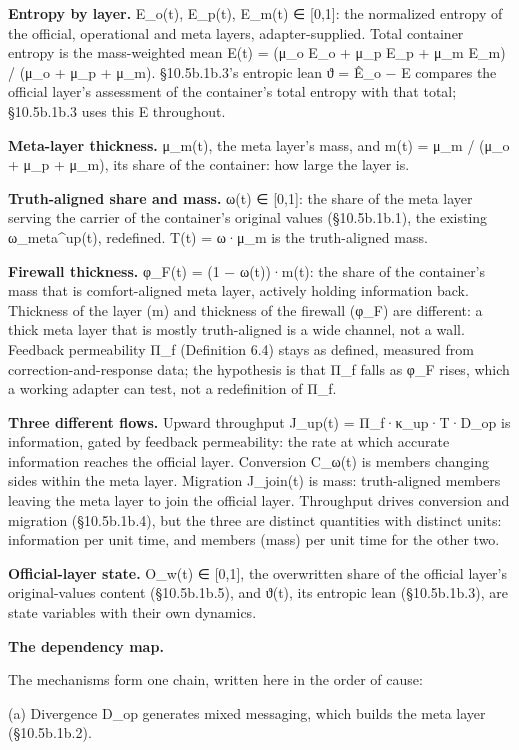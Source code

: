 \documentclass[
]{article}
\begin{document}
\textbf{Entropy by layer.} E\_o(t), E\_p(t), E\_m(t) ∈ {[}0,1{]}: the
normalized entropy of the official, operational and meta layers,
adapter-supplied. Total container entropy is the mass-weighted mean E(t)
= (μ\_o E\_o + μ\_p E\_p + μ\_m E\_m) / (μ\_o + μ\_p + μ\_m).
§10.5b.1b.3's entropic lean ϑ = Ê\_o − E compares the official layer's
assessment of the container's total entropy with that total; §10.5b.1b.3
uses this E throughout.

\textbf{Meta-layer thickness.} μ\_m(t), the meta layer's mass, and m(t)
= μ\_m / (μ\_o + μ\_p + μ\_m), its share of the container: how large the
layer is.

\textbf{Truth-aligned share and mass.} ω(t) ∈ {[}0,1{]}: the share of
the meta layer serving the carrier of the container's original values
(§10.5b.1b.1), the existing ω\_meta\^{}up(t), redefined. T(t) = ω·μ\_m
is the truth-aligned mass.

\textbf{Firewall thickness.} φ\_F(t) = (1 − ω(t))·m(t): the share of the
container's mass that is comfort-aligned meta layer, actively holding
information back. Thickness of the layer (m) and thickness of the
firewall (φ\_F) are different: a thick meta layer that is mostly
truth-aligned is a wide channel, not a wall. Feedback permeability Π\_f
(Definition 6.4) stays as defined, measured from correction-and-response
data; the hypothesis is that Π\_f falls as φ\_F rises, which a working
adapter can test, not a redefinition of Π\_f.

\textbf{Three different flows.} Upward throughput J\_up(t) =
Π\_f·κ\_up·T·D\_op is information, gated by feedback permeability: the
rate at which accurate information reaches the official layer.
Conversion C\_ω(t) is members changing sides within the meta layer.
Migration J\_join(t) is mass: truth-aligned members leaving the meta
layer to join the official layer. Throughput drives conversion and
migration (§10.5b.1b.4), but the three are distinct quantities with
distinct units: information per unit time, and members (mass) per unit
time for the other two.

\textbf{Official-layer state.} O\_w(t) ∈ {[}0,1{]}, the overwritten
share of the official layer's original-values content (§10.5b.1b.5), and
ϑ(t), its entropic lean (§10.5b.1b.3), are state variables with their
own dynamics.

\textbf{The dependency map.}

The mechanisms form one chain, written here in the order of cause:

(a) Divergence D\_op generates mixed messaging, which builds the meta
layer (§10.5b.1b.2).
\end{document}
